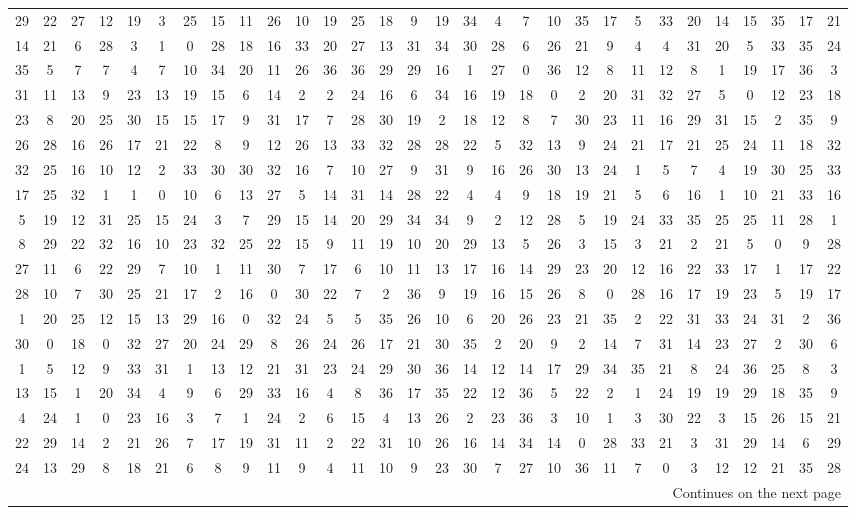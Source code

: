 \documentclass[11pt,twoside]{article}
\numberwithin{Theorem}{section}
\numberwithin{Definition}{section}
\numberwithin{Lemma}{section}
\numberwithin{Algorithm}{section}
\numberwithin{equation}{section}
\begin{document}
\begin{table}
\begin{tabular}{|*{30}{c|}}
29 &22 &27 &12 &19 &3 &25 &15 &11 &26 &10 &19 &25 &18 &9&19 &34 &4 &7 &10 &35 &17 &5 &33 &20 &14 &15 &35 &17 &21\\
14 &21 &6 &28 &3 &1 &0 &28 &18 &16 &33 &20 &27 &13 &31&34 &30 &28 &6 &26 &21 &9 &4 &4 &31 &20 &5 &33 &35 &24\\
35 &5 &7 &7 &4 &7 &10 &34 &20 &11 &26 &36 &36 &29 &29&16 &1 &27 &0 &36 &12 &8 &11 &12 &8 &1 &19 &17 &36 &3\\
31 &11 &13 &9 &23 &13 &19 &15 &6 &14 &2 &2 &24 &16 &6&34 &16 &19 &18 &0 &2 &20 &31 &32 &27 &5 &0 &12 &23 &18\\
23 &8 &20 &25 &30 &15 &15 &17 &9 &31 &17 &7 &28 &30 &19&2 &18 &12 &8 &7 &30 &23 &11 &16 &29 &31 &15 &2 &35 &9\\
26 &28 &16 &26 &17 &21 &22 &8 &9 &12 &26 &13 &33 &32 &28&28 &22 &5 &32 &13 &9 &24 &21 &17 &21 &25 &24 &11 &18 &32\\
32 &25 &16 &10 &12 &2 &33 &30 &30 &32 &16 &7 &10 &27 &9&31 &9 &16 &26 &30 &13 &24 &1 &5 &7 &4 &19 &30 &25 &33\\
17 &25 &32 &1 &1 &0 &10 &6 &13 &27 &5 &14 &31 &14 &28&22 &4 &4 &9 &18 &19 &21 &5 &6 &16 &1 &10 &21 &33 &16\\
5 &19 &12 &31 &25 &15 &24 &3 &7 &29 &15 &14 &20 &29 &34&34 &9 &2 &12 &28 &5 &19 &24 &33 &35 &25 &25 &11 &28 &1\\
8 &29 &22 &32 &16 &10 &23 &32 &25 &22 &15 &9 &11 &19 &10&20 &29 &13 &5 &26 &3 &15 &3 &21 &2 &21 &5 &0 &9 &28\\
27 &11 &6 &22 &29 &7 &10 &1 &11 &30 &7 &17 &6 &10 &11&13 &17 &16 &14 &29 &23 &20 &12 &16 &22 &33 &17 &1 &17 &22\\
28 &10 &7 &30 &25 &21 &17 &2 &16 &0 &30 &22 &7 &2 &36&9 &19 &16 &15 &26 &8 &0 &28 &16 &17 &19 &23 &5 &19 &17\\
1 &20 &25 &12 &15 &13 &29 &16 &0 &32 &24 &5 &5 &35 &26&10 &6 &20 &26 &23 &21 &35 &2 &22 &31 &33 &24 &31 &2 &36\\
30 &0 &18 &0 &32 &27 &20 &24 &29 &8 &26 &24 &26 &17 &21&30 &35 &2 &20 &9 &2 &14 &7 &31 &14 &23 &27 &2 &30 &6\\
1 &5 &12 &9 &33 &31 &1 &13 &12 &21 &31 &23 &24 &29 &30&36 &14 &12 &14 &17 &29 &34 &35 &21 &8 &24 &36 &25 &8 &3\\
13 &15 &1 &20 &34 &4 &9 &6 &29 &33 &16 &4 &8 &36 &17&35 &22 &12 &36 &5 &22 &2 &1 &24 &19 &19 &29 &18 &35 &9\\
4 &24 &1 &0 &23 &16 &3 &7 &1 &24 &2 &6 &15 &4 &13&26 &2 &23 &36 &3 &10 &1 &3 &30 &22 &3 &15 &26 &15 &21\\
22 &29 &14 &2 &21 &26 &7 &17 &19 &31 &11 &2 &22 &31 &10&26 &16 &14 &34 &14 &0 &28 &33 &21 &3 &31 &29 &14 &6 &29\\
24 &13 &29 &8 &18 &21 &6 &8 &9 &11 &9 &4 &11 &10 &9&23 &30 &7 &27 &10 &36 &11 &7 &0 &3 &12 &12 &21 &35 &28\\
  \hline
    \multicolumn{30}{r}{Continues on the next page} \\
      \end{tabular}
\end{table}
\end{document}
